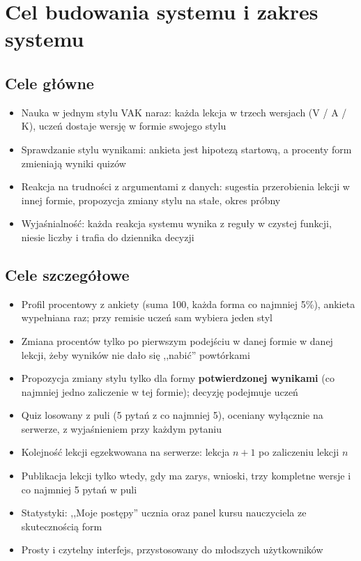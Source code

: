 \section{Cel budowania systemu i zakres systemu}

\subsection{Cele główne}

\begin{itemize}[leftmargin=*]
    \item Nauka w jednym stylu VAK naraz: każda lekcja w trzech wersjach (V / A / K), uczeń dostaje wersję w formie swojego stylu
    \item Sprawdzanie stylu wynikami: ankieta jest hipotezą startową, a procenty form zmieniają wyniki quizów
    \item Reakcja na trudności z argumentami z danych: sugestia przerobienia lekcji w innej formie, propozycja zmiany stylu na stałe, okres próbny
    \item Wyjaśnialność: każda reakcja systemu wynika z reguły w czystej funkcji, niesie liczby i trafia do dziennika decyzji
\end{itemize}

\subsection{Cele szczegółowe}

\begin{itemize}[leftmargin=*]
    \item Profil procentowy z ankiety (suma 100, każda forma co najmniej 5\%), ankieta wypełniana raz; przy remisie uczeń sam wybiera jeden styl
    \item Zmiana procentów tylko po pierwszym podejściu w danej formie w danej lekcji, żeby wyników nie dało się ,,nabić'' powtórkami
    \item Propozycja zmiany stylu tylko dla formy \textbf{potwierdzonej wynikami} (co najmniej jedno zaliczenie w tej formie); decyzję podejmuje uczeń
    \item Quiz losowany z puli (5 pytań z co najmniej 5), oceniany wyłącznie na serwerze, z wyjaśnieniem przy każdym pytaniu
    \item Kolejność lekcji egzekwowana na serwerze: lekcja $n+1$ po zaliczeniu lekcji $n$
    \item Publikacja lekcji tylko wtedy, gdy ma zarys, wnioski, trzy kompletne wersje i co najmniej 5 pytań w puli
    \item Statystyki: ,,Moje postępy'' ucznia oraz panel kursu nauczyciela ze skutecznością form
    \item Prosty i czytelny interfejs, przystosowany do młodszych użytkowników
\end{itemize}

